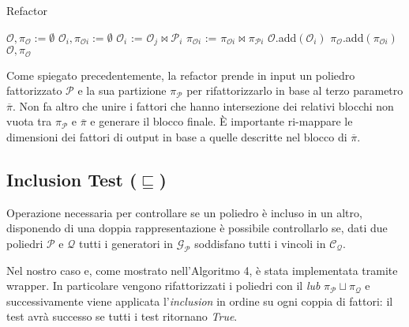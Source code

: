 \documentclass{mimosis}
\theoremstyle{definition}
\begin{document}
\begin{algorithm}[H]
\caption{Refactor}\label{refactor}
\begin{algorithmic}[1]
\State$\mathcal{O}, \pi_{\mathcal{O}} := \emptyset$
 
\State$\mathcal{O}_{i}, \pi_{\mathcal{O}i} := \emptyset$
 
\State$\mathcal{O}_{i}$ := $\mathcal{O}_{j} \bowtie \mathcal{P}_{i}$
\State$\pi_{\mathcal{O}i}$ := $\pi_{\mathcal{O}i} \bowtie \pi_{\mathcal{P}i}$
\EndIf
\EndFor
\State$\mathcal{O}$.add$(\mathcal{O}_{i})$
\State$\pi_{\mathcal{O}}$.add$(\pi_{\mathcal{O}i})$
\EndFor
\State{}
\State\Return$\mathcal{O}, \pi_{\mathcal{O}}$
\EndFunction
\end{algorithmic}
\end{algorithm}

Come spiegato precedentemente, la refactor prende in input un poliedro
fattorizzato \(\mathcal{P}\) e la sua partizione \(\pi_{\mathcal{P}}\) per
rifattorizzarlo in base al terzo parametro \(\overline{\pi}\). Non fa altro che
unire i fattori che hanno intersezione dei relativi blocchi non vuota tra
\(\pi_{\mathcal{P}}\) e \(\overline{\pi}\) e generare il blocco finale. È importante
ri-mappare le dimensioni dei fattori di output in base a quelle descritte nel
blocco di \(\overline{\pi}\).

\subsection{Inclusion Test (\(\sqsubseteq\))}
\label{sec:org1ccfbd0}
Operazione necessaria per controllare se un poliedro è incluso in un altro,
disponendo di una doppia rappresentazione è possibile controllarlo se, dati due
poliedri \(\mathcal{P}\) e \(\mathcal{Q}\) tutti i generatori in
\(\mathcal{G}_{\mathcal{P}}\) soddisfano tutti i vincoli in
\(\mathcal{C}_{\mathcal{Q}}\).

Nel nostro caso e, come mostrato nell'Algoritmo 4, è stata implementata tramite
wrapper. In particolare vengono rifattorizzati i poliedri con il \emph{lub}
\(\pi_{\mathcal{P}} \sqcup \pi_{\mathcal{Q}}\) e successivamente viene applicata
l'\emph{inclusion} in ordine su ogni coppia di fattori: il test avrà successo se
tutti i test ritornano \emph{True}.
\end{document}
